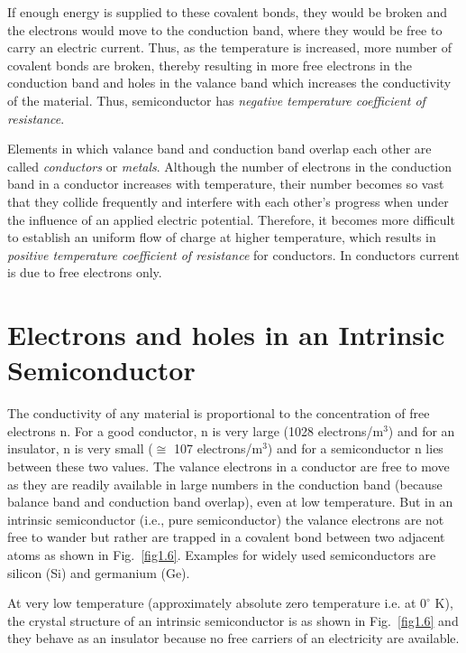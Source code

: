If enough energy is supplied to these covalent bonds, they would be broken and the electrons would move to the conduction band, where they would be free to carry an electric current. Thus, as the temperature is increased, more number of covalent bonds are broken, thereby resulting in more free electrons in the conduction band and holes in the valance band which increases the conductivity of the material. Thus, semiconductor has {\em negative temperature coefficient of resistance}.

 Elements in which valance band and conduction band overlap each other are called {\em conductors} or {\em metals}. Although the number of electrons in the conduction band in a conductor increases with temperature, their number becomes so vast that they collide frequently and interfere with each other's progress when under the influence of an applied electric potential. Therefore, it becomes more difficult to establish an uniform flow of charge at higher temperature, which results in {\em positive temperature coefficient of resistance} for conductors. In conductors current is due to free electrons only.

\section{Electrons and holes in an Intrinsic Semiconductor}\label{sec1.2}

The conductivity of any material is proportional to the concentration of free electrons n. For a good conductor, n is very large (1028 electrons/m$^{3}$) and for an insulator, n is very small ($\cong$ 107 electrons/m$^{3}$) and for a semiconductor n lies between these two values. The valance electrons in a conductor are free to move as they are readily available in large numbers in the conduction band (because balance band and conduction band overlap), even at low temperature. But in an intrinsic semiconductor (i.e., pure semiconductor) the valance electrons are not free to wander but rather are trapped in a covalent bond between two adjacent atoms as shown in Fig.~\ref{fig1.6}. Examples for widely used semiconductors are silicon (Si) and germanium (Ge).

At very low temperature (approximately absolute zero temperature i.e. at $0^{\circ}$ K), the crystal structure of an intrinsic semiconductor is as shown in Fig.~\ref{fig1.6} and they behave as an insulator because no free carriers of an electricity are available.

